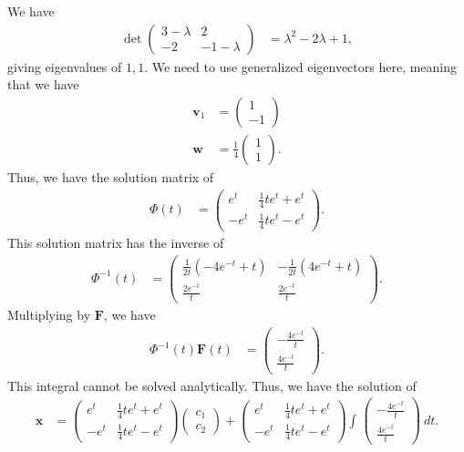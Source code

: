 \documentclass[10pt]{mypackage}
\begin{document}
\begin{solution}[8.3, Problem 20]
  We have
  \begin{align*}
    \det \begin{pmatrix}3-\lambda & 2 \\ -2 & -1-\lambda\end{pmatrix} &= \lambda^2 - 2\lambda + 1,
  \end{align*}
  giving eigenvalues of $1,1$. We need to use generalized eigenvectors here, meaning that we have
  \begin{align*}
    \mathbf{v}_1 &= \begin{pmatrix}1\\-1\end{pmatrix}\\
    \mathbf{w} &= \frac{1}{4} \begin{pmatrix}1\\1\end{pmatrix}.
  \end{align*}
  Thus, we have the solution matrix of
  \begin{align*}
    \Phi(t) &= \begin{pmatrix}e^{t} & \frac{1}{4}te^{t} + e^{t} \\ -e^{t} & \frac{1}{4}te^{t} - e^{t}\end{pmatrix}.
  \end{align*}
  This solution matrix has the inverse of
  \begin{align*}
    \Phi^{-1}\left( t \right) &= \begin{pmatrix}\frac{1}{2t}\left( -4e^{-t} + t \right) & -\frac{1}{2t}\left( 4e^{-t} + t \right) \\ \frac{2e^{-t}}{t} & \frac{2e^{-t}}{t}\end{pmatrix}.
  \end{align*}
  Multiplying by $\mathbf{F}$, we have
  \begin{align*}
    \Phi^{-1}(t) \mathbf{F}\left( t \right) &= \begin{pmatrix}-\frac{4e^{-t}}{t} \\ \frac{4e^{-t}}{t}\end{pmatrix}.
  \end{align*}
  This integral cannot be solved analytically. Thus, we have the solution of
  \begin{align*}
    \mathbf{x} &= \begin{pmatrix}e^{t} & \frac{1}{4}te^{t} + e^{t} \\ -e^{t} & \frac{1}{4}te^{t} - e^{t}\end{pmatrix} \begin{pmatrix}c_1\\c_2\end{pmatrix} + \begin{pmatrix}e^{t} & \frac{1}{4}te^{t} + e^{t} \\ -e^{t} & \frac{1}{4}te^{t} - e^{t}\end{pmatrix}\int_{}^{} \begin{pmatrix}-\frac{4e^{-t}}{t} \\ \frac{4e^{-t}}{t}\end{pmatrix}\:dt.
  \end{align*}
\end{solution}
\end{document}
